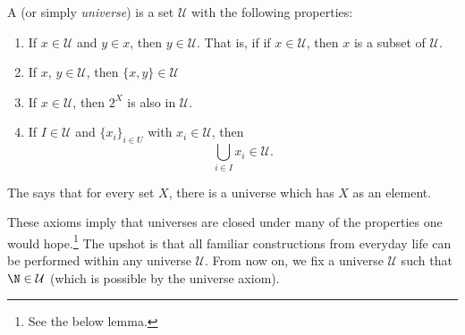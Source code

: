 \documentclass[main.tex]{subfiles}
\begin{document}
\begin{definition}
  \label{def:universe}
  A  (or simply \emph{universe}) is a set $\mathcal{U}$ with the following properties:
  \begin{enumerate}[label=\emph{U\arabic*.}]
    \item If $x \in \mathcal{U}$ and $y \in x$, then $y \in \mathcal{U}$. That is, if if $x \in \mathcal{U}$, then $x$ is a subset of $\mathcal{U}$.

    \item If $x$, $y \in \mathcal{U}$, then $\{x, y\} \in \mathcal{U}$

    \item If $x \in \mathcal{U}$, then $2^{X}$ is also in $\mathcal{U}$.

    \item If $I \in \mathcal{U}$ and $\{x_{i}\}_{i \in U}$ with $x_{i} \in \mathcal{U}$, then
      \begin{equation*}
        \bigcup_{i \in I} x_{i} \in \mathcal{U}.
      \end{equation*}
  \end{enumerate}
\end{definition}

\begin{definition}
  \label{def:universe_axiom}
  The  says that for every set $X$, there is a universe which has $X$ as an element.
\end{definition}

These axioms imply that universes are closed under many of the properties one would hope.\footnote{See the below lemma.} The upshot is that all familiar constructions from everyday life can be performed within any universe $\mathcal{U}$. From now on, we fix a universe $\mathcal{U}$ such that $\N \in \mathcal{U}$ (which is possible by the universe axiom).
\end{document}

